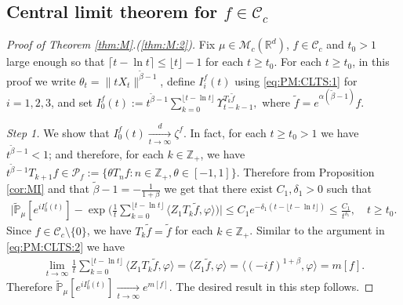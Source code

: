\documentclass[12pt,a4paper]{amsart}
\theoremstyle{plain}
\theoremstyle{definition}
\numberwithin{equation}{section}
\begin{document}
\subsection{Central limit theorem for $f \in \mathcal C_c$}
\begin{proof}[Proof of Theorem \ref{thm:M}.(\ref{thm:M:2})]
  	Fix $\mu\in \mathcal M_c(\mathbb R^d)$, $f\in \mathcal C_c$ and $t_0 > 1$ large enough so that $ \lceil t - \ln t\rceil \leq \lfloor t \rfloor - 1$ for each $t\geq t_0$.
 For each $t\geq t_0$, in this proof we write $\theta_t = \|t X_t\|^{\tilde \beta - 1}$,  define $I_i^f(t)$ using \eqref{eq:PM:CLTS:1}  for $i = 1,2,3$, and set
$
    I^f_0(t)
    := t^{\tilde \beta - 1}\sum_{k=0}^{\lfloor t-\ln t \rfloor} \Upsilon_{t-k-1}^{T_{k} \tilde f},
$
where $\tilde f = e^{\alpha(\tilde \beta - 1)} f$.

  \emph{Step 1.} We show that $I^f_0(t) \xrightarrow[t\to \infty]{d} \zeta^f$.
  In fact, for each $t \geq  t_0 > 1$ we have $t^{\tilde \beta - 1} < 1$; and therefore, for each $k \in \mathbb Z_+$, we have $t^{\tilde \beta - 1} T_{k+1} f \in \mathcal P_f:=\{\theta T_n f: n \in \mathbb Z_+, \theta \in [-1,1]\}$.
  Therefore from Proposition \ref{cor:MI} and that $\tilde \beta - 1 = -\frac{1}{1+\beta}$ we get that there exist $C_1,\delta_1 > 0$ such that
  \begin{align}
    \Big|\mathbb{\widetilde{P}}_{\mu} [e^{i I^f_0(t)} ]-\exp\Big(\frac{1}{t}\sum_{k=0}^{\lfloor t-\ln t \rfloor} \langle Z_1T_{k}\tilde f, \varphi\rangle \Big)\Big|
    \leq C_1 e^{-\delta_1(t - \lfloor t - \ln t\rfloor)}
    \leq \frac{C_1}{t^{\delta_1}},
    \quad t\geq t_0.
  \end{align}
Since $f \in \mathcal C_c\setminus \{0\}$, we have $T_k \tilde f = \tilde f$ for each $k \in \mathbb Z_+$.
  Similar to the argument in \eqref{eq:PM:CLTS:2} we have
  \begin{align}
    \label{CLT:C:eq:m}
    \lim_{t\to \infty} \frac{1}{t}\sum_{k=0}^{\lfloor t-\ln t \rfloor} \langle Z_1 T_{k}\tilde f, \varphi\rangle
    = \langle Z_1 \tilde f,\varphi \rangle
    = \langle (-if)^{1+\beta}, \varphi \rangle
    = m[f].
  \end{align}
  Therefore $\mathbb {\widetilde P}_\mu[e^{i I^f_0(t)}] \xrightarrow[t\to \infty]{} e^{m[f]}$.
The desired result in this step follows.


\end{proof}
\end{document}
